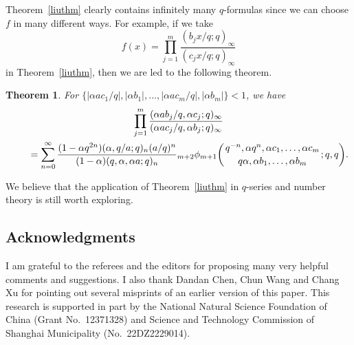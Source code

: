 \documentclass[pdftex]{sigma}
\numberwithin{equation}{section}
\newtheorem{Theorem}{Theorem}[section]
\begin{document}
Theorem~\ref{liuthm} clearly contains infinitely many $q$-formulas since we can choose $f$ in many different ways. For example, if we take
\[
f(x)=\prod_{j=1}^m \frac{(b_j x/q; q)_\infty} {(c_j x/q; q)_\infty}
\]
in Theorem~\ref{liuthm}, then we are led to the following theorem.
\begin{Theorem}%
For $\{|\alpha a c_1/q|, |\alpha b_1|, \ldots, |\alpha a c_m/q|, |\alpha b_m|\}<1$, we have
\begin{gather*}
\prod_{j=1}^m \frac{(\alpha a b_j/q, \alpha c_j; q)_\infty}
{(\alpha a c_j/q, \alpha b_j; q)_\infty}
\\
\qquad{}=\sum_{n=0}^\infty \frac{(1-\alpha q^{2n})(\alpha, q/a; q)_n (a/q)^n}{(1-\alpha)(q, \alpha,\alpha a; q)_n}
{_{m+2}\phi_{m+1}}\biggl({{q^{-n}, \alpha q^n, \alpha c_1, \ldots, \alpha c_m}\atop{q\alpha, \alpha b_1, \ldots, \alpha b_m}}; q, q\biggr).
\end{gather*}
\end{Theorem}
We believe that the application of Theorem~\ref{liuthm} in $q$-series and number theory is still worth exploring.

\subsection*{Acknowledgments}
I am grateful to the referees and the editors for proposing many very helpful comments and suggestions. I also thank Dandan Chen, Chun Wang and Chang Xu for pointing out several misprints of an earlier version of this paper. This research is supported in part by the National Natural Science Foundation of China (Grant No.~12371328) and Science and Technology Commission of Shanghai Municipality (No.~22DZ2229014).
\end{document}

